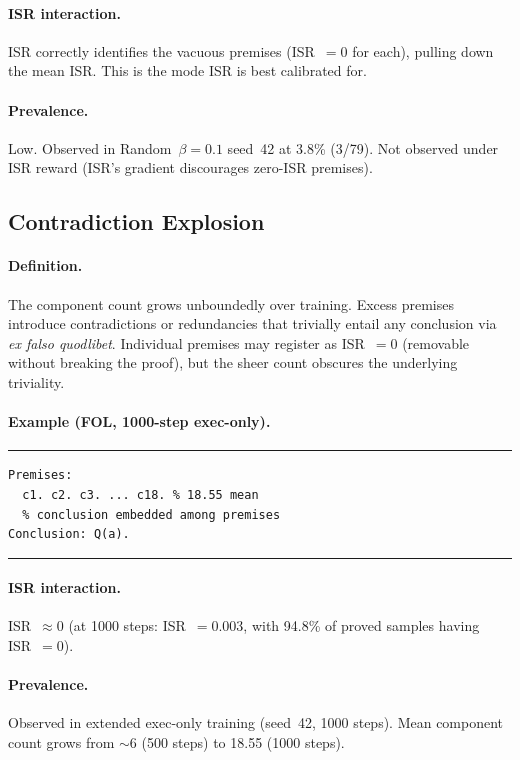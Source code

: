 \paragraph{ISR interaction.}
ISR correctly identifies the vacuous premises (ISR~$=0$ for each), pulling down the mean ISR.
This is the mode ISR is best calibrated for.

\paragraph{Prevalence.}
Low. Observed in Random~$\beta{=}0.1$ seed~42 at 3.8\% (3/79).
Not observed under ISR reward (ISR's gradient discourages zero-ISR premises).


\subsection{Contradiction Explosion}

\paragraph{Definition.}
The component count grows unboundedly over training.
Excess premises introduce contradictions or redundancies that trivially entail any conclusion via \emph{ex falso quodlibet}.
Individual premises may register as ISR~$=0$ (removable without breaking the proof), but the sheer count obscures the underlying triviality.

\paragraph{Example (FOL, 1000-step exec-only).}
\smallskip\noindent\rule{\columnwidth}{0.3pt}
{\small\begin{verbatim}
Premises:
  c1. c2. c3. ... c18. % 18.55 mean
  % conclusion embedded among premises
Conclusion: Q(a).
\end{verbatim}}
\noindent\rule{\columnwidth}{0.3pt}\smallskip

\paragraph{ISR interaction.}
ISR~$\approx 0$ (at 1000 steps: ISR~$=0.003$, with 94.8\% of proved samples having ISR~$=0$).

\paragraph{Prevalence.}
Observed in extended exec-only training (seed~42, 1000 steps).
Mean component count grows from ${\sim}6$ (500 steps) to 18.55 (1000 steps).


